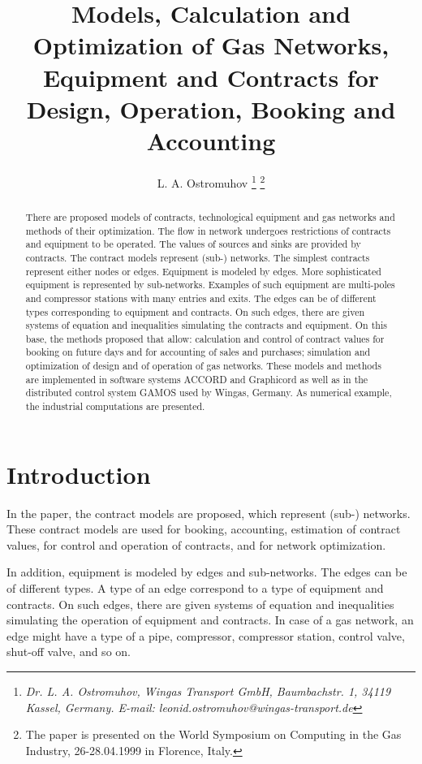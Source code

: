 \documentclass{article}
\begin{document}
\title{Models, Calculation and Optimization of Gas Networks, Equipment and
Contracts for Design, Operation, Booking and Accounting}
\author{L. A. Ostromuhov \thanks{\textit{Dr. L. A. Ostromuhov, Wingas
Transport GmbH, Baumbachstr. 1, 34119 Kassel, Germany. E-mail:
leonid.ostromuhov@wingas-transport.de}} \thanks{The paper is presented on the World Symposium on Computing in the Gas
Industry, 26-28.04.1999 in Florence, Italy. }}
\date{}
\maketitle

\begin{abstract}
\qquad There are proposed models of contracts, technological equipment and
gas networks and methods of their optimization. The flow in network
undergoes restrictions of contracts and equipment to be operated. The values
of sources and sinks are provided by contracts. The contract models
represent (sub-) networks. The simplest contracts represent either nodes or
edges. Equipment is modeled by edges. More sophisticated equipment is
represented by sub-networks. Examples of such equipment are multi-poles and
compressor stations with many entries and exits. The edges can be of
different types corresponding to equipment and contracts. On such edges,
there are given systems of equation and inequalities simulating the
contracts and equipment. On this base, the methods proposed that allow:
calculation and control of contract values for booking on future days and
for accounting of sales and purchases; simulation and optimization of design
and of operation of gas networks. These models and methods are implemented
in software systems ACCORD and Graphicord as well as in the distributed
control system GAMOS used by Wingas, Germany. As numerical example, the
industrial computations are presented.
\end{abstract}

\tableofcontents

\section{Introduction}

In the paper, the contract models are proposed, which represent (sub-)
networks. These contract models are used for booking, accounting, estimation
of contract values, for control and operation of contracts, and for network
optimization.

In addition, equipment is modeled by edges and sub-networks. The edges can
be of different types. A type of an edge correspond to a type of equipment
and contracts. On such edges, there are given systems of equation and
inequalities simulating the operation of equipment and contracts. In case of
a gas network, an edge might have a type of a pipe, compressor, compressor
station, control valve, shut-off valve, and so on.
\end{document}
